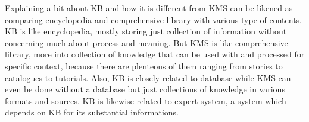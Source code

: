 Explaining a bit about \ac{KB} and how it is different from \ac{KMS} can be likened as comparing encyclopedia and comprehensive library with various type of contents.
\ac{KB} is like encyclopedia, mostly storing just collection of information without concerning much about process and meaning.
But \ac{KMS} is like comprehensive library, more into collection of knowledge that can be used with and processed for specific context, because there are plenteous of them ranging from stories to catalogues to tutorials.
Also, \ac{KB} is closely related to database while \ac{KMS} can even be done without a database but just collections of knowledge in various formats and sources.
\ac{KB} is likewise related to expert system, a system which depends on \ac{KB} for its substantial informations.
